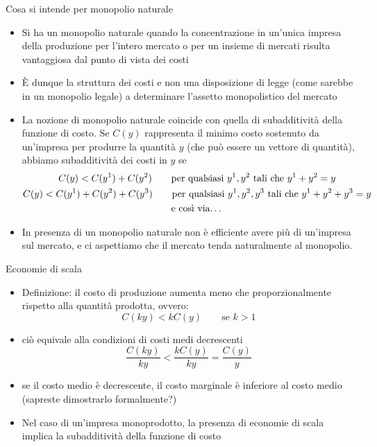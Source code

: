 \documentclass[aspectratio=64,11pt]{beamer}
\begin{document}
\begin{frame}{Cosa si intende per monopolio naturale}
\begin{itemize}
\item Si ha un monopolio naturale quando la concentrazione in un'unica impresa
della produzione per l'intero mercato o per un insieme di mercati risulta
vantaggiosa dal punto di vista dei costi
\item È dunque la struttura dei costi e non una disposizione di legge (come
sarebbe in un monopolio \alert{legale}) a determinare l'assetto monopolistico del
mercato
\item La nozione di monopolio naturale coincide con quella di
\alert{subadditività della funzione di costo}. Se $C(y)$ rappresenta il \alert{minimo}
costo sostenuto da un'impresa per produrre la quantità $y$ (che può essere
un vettore di quantità), abbiamo subadditività dei costi in $y$ se
\begin{gather*}
 C(y) < C(y^1)+C(y^2) \qquad\text{per qualsiasi $y^1,y^2$ tali che $y^1+y^2=y$}\\
 C(y) < C(y^1)+C(y^2)+C(y^3) \qquad\text{per qualsiasi $y^1,y^2,y^3$ tali che $y^1+y^2+y^3=y$}\\
 \text{e così via\dots}
\end{gather*}
\item In presenza di un monopolio naturale \alert{non è efficiente} avere più di un'impresa
sul mercato, e ci aspettiamo che il mercato tenda naturalmente al \alert{monopolio}.
\end{itemize}
\end{frame}

\begin{frame}{Economie di scala}
\begin{itemize}
\item \alert{Definizione}: il costo di produzione aumenta meno che
proporzionalmente rispetto alla quantità prodotta, ovvero:
\begin{equation*}
 C(ky) < kC(y) \qquad\text{se }k>1
\end{equation*}
\item ciò equivale alla condizioni di \alert{costi medi decrescenti}
\begin{equation*}
\frac{C(ky)}{ky} < \frac{kC(y)}{ky} = \frac{C(y)}{y} 
\end{equation*}
\item se il costo medio è decrescente, \alert{il costo marginale è inferiore al costo
medio} (sapreste dimostrarlo formalmente?)
\item Nel caso di un'impresa monoprodotto, la presenza di economie di scala
implica la subadditività della funzione di costo
\end{itemize}
\end{frame}
\end{document}
